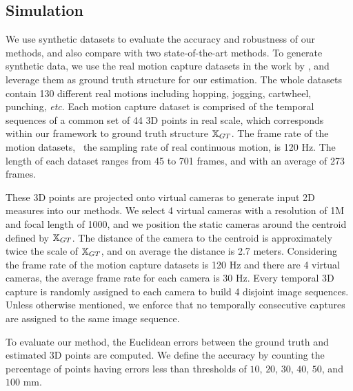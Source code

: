 \subsection{Simulation}
We use synthetic datasets to evaluate the accuracy and robustness of our methods, and also compare with two state-of-the-art methods.
To generate synthetic data, we use the real motion capture datasets in the work by \citet{cg-2007-2}, and leverage them as ground truth structure for our estimation.
The whole datasets contain 130 different real motions including hopping, jogging, cartwheel, punching, \emph{etc}.
Each motion capture dataset is comprised of the temporal sequences of a common set of 44 3D points in real scale, which corresponds within our framework to ground truth structure $\mathbb X_{GT}$. The frame rate of the motion datasets, \ie~the sampling rate of real continuous motion, is 120 Hz. The length of each dataset ranges from 45 to 701 frames, and with an average of 273 frames. 

These 3D points are projected onto virtual cameras to generate input 2D measures into our methods.
We select 4 virtual cameras with a resolution of 1M and focal length of 1000, and we position the static cameras around the centroid defined by $\mathbb X_{GT}$. 
The distance of the camera to the centroid is approximately twice the scale of $\mathbb X_{GT}$, and on average the distance is 2.7 meters.
Considering the frame rate of the motion capture datasets is 120 Hz and there are 4 virtual cameras, the average frame rate for each camera is 30 Hz.
Every temporal 3D capture is randomly assigned to each camera to build 4 disjoint image sequences. %
Unless otherwise mentioned, we enforce that no temporally consecutive captures are assigned to the same image sequence.

To evaluate our method, the Euclidean errors between the ground truth and estimated 3D points are computed.
We define the accuracy by counting the percentage of points having errors less than thresholds of $10$, $20$, $30$, $40$, $50$, and $100$ mm.

